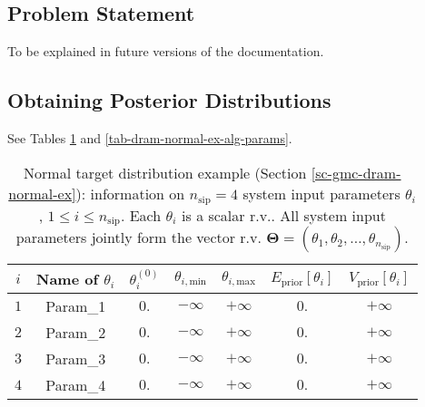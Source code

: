 \subsection{Problem Statement}

To be explained in future versions of the documentation.

\subsection{Obtaining Posterior Distributions}

See Tables \ref{tab-dram-normal-ex-sys-input-params} and \ref{tab-dram-normal-ex-alg-params}.

\begin{table}[h!]
\begin{center}
\begin{tabular}{|c|c|c|c|c|c|c|}
\hline
 $i$      & Name of $\theta_i$ & $\theta_i^{(0)}$ & $\theta_{i,\text{min}}$ & $\theta_{i,\text{max}}$ & $E_{\text{prior}}[\theta_i]$ & $V_{\text{prior}}[\theta_i]$ \\
\hline
\hline
 $1$      & Param\_1           & $0.$             & $-\infty$               & $+\infty$               & $0.$                         & $+\infty$                    \\
\hline
 $2$      & Param\_2           & $0.$             & $-\infty$               & $+\infty$               & $0.$                         & $+\infty$                    \\
\hline
 $3$      & Param\_3           & $0.$             & $-\infty$               & $+\infty$               & $0.$                         & $+\infty$                    \\
\hline
 $4$      & Param\_4           & $0.$             & $-\infty$               & $+\infty$               & $0.$                         & $+\infty$                    \\
\hline
\end{tabular}
\caption{Normal target distribution example (Section \ref{sc-gmc-dram-normal-ex}):
information on $n_{\text{sip}}=4$ system input parameters $\theta_i$, $1\leqslant i\leqslant n_{\text{sip}}$.
Each $\theta_i$ is a scalar r.v.. All system input parameters jointly form the vector r.v. $\boldsymbol{\Theta}=(\theta_1,\theta_2,\ldots,\theta_{n_{\text{sip}}})$.
}
\label{tab-dram-normal-ex-sys-input-params}
\end{center}
\end{table}

